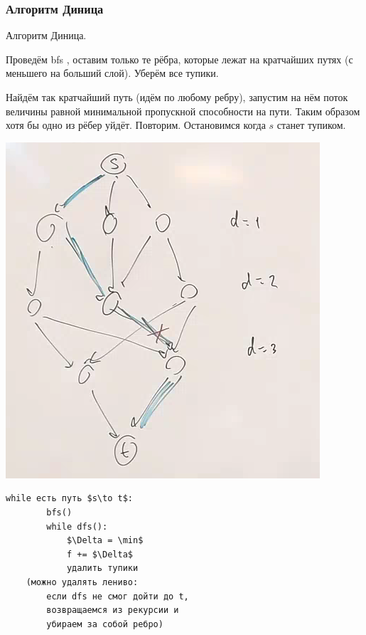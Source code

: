 \subsubsection{Алгоритм Диница}

\begin{definition}
    Алгоритм Диница.

    Проведём  bfs , оставим только те  рёбра, которые лежат на кратчайших путях (с меньшего на больший слой). Уберём все тупики.

    Найдём так кратчайший путь (идём по любому ребру), запустим на нём поток величины равной минимальной пропускной способности на пути. 
    Таким образом хотя бы одно из рёбер уйдёт. Повторим. Остановимся когда $s$ станет тупиком.
        
\end{definition}

\begin{center}
    \includegraphics[scale=0.7]{img/dinitsa_algoritm}    
\end{center}

\begin{lstlisting}[mathescape=true]
    while есть путь $s\to t$:
        bfs()
        while dfs():
            $\Delta = \min$
            f += $\Delta$
            удалить тупики 
    (можно удалять лениво: 
        если dfs не смог дойти до t, 
        возвращаемся из рекурсии и 
        убираем за собой ребро)
\end{lstlisting}

